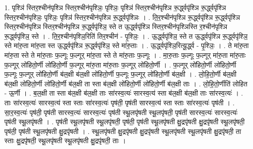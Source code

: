 \documentclass[17pt]{extarticle}
\begin{document}
1. पृश्ञि॑ स्तिर॒श्चीन॑पृश्ञि स्तिर॒श्चीन॑पृश्ञिः॒ पृश्ञिः॒ पृश्ञि॑ स्तिर॒श्चीन॑पृश्ञि रू॒र्द्ध्वपृ॑श्ञि रू॒र्द्ध्वपृ॑श्ञि स्तिर॒श्चीन॑पृश्ञिः॒ पृश्ञिः॒ पृश्ञि॑ स्तिर॒श्चीन॑पृश्ञि रू॒र्द्ध्वपृ॑श्ञिः । . ति॒र॒श्चीन॑पृश्ञि रू॒र्द्ध्वपृ॑श्ञि रू॒र्द्ध्वपृ॑श्ञि स्तिर॒श्चीन॑पृश्ञि स्तिर॒श्चीन॑पृश्ञि रू॒र्द्ध्वपृ॑श्ञि॒ स्ते त ऊ॒र्द्ध्वपृ॑श्ञि स्तिर॒श्चीन॑पृश्ञिस्ति र॒श्चीन॑पृश्ञि रू॒र्द्ध्वपृ॑श्ञि॒ स्ते । . ति॒र॒श्चीन॑पृश्ञि॒रिति॑ तिर॒श्चीन॑ - पृ॒श्ञिः॒ । . ऊ॒र्द्ध्वपृ॑श्ञि॒ स्ते त ऊ॒र्द्ध्वपृ॑श्ञि रू॒र्द्ध्वपृ॑श्ञि॒ स्ते मा॑रु॒ता मा॑रु॒ता स्त ऊ॒र्द्ध्वपृ॑श्ञि रू॒र्द्ध्वपृ॑श्ञि॒ स्ते मा॑रु॒ताः । . ऊ॒र्द्ध्वपृ॑श्ञि॒रित्यू॒र्द्ध्व - पृ॒श्ञिः॒ । . ते मा॑रु॒ता मा॑रु॒ता स्ते ते मा॑रु॒ताः फ॒ल्गूः फ॒ल्गूर् मा॑रु॒ता स्ते ते मा॑रु॒ताः फ॒ल्गूः । . मा॒रु॒ताः फ॒ल्गूः फ॒ल्गूर् मा॑रु॒ता मा॑रु॒ताः फ॒ल्गूर् लो॑हितो॒र्णी लो॑हितो॒र्णी फ॒ल्गूर् मा॑रु॒ता मा॑रु॒ताः फ॒ल्गूर् लो॑हितो॒र्णी । . फ॒ल्गूर् लो॑हितो॒र्णी लो॑हितो॒र्णी फ॒ल्गूः फ॒ल्गूर् लो॑हितो॒र्णी ब॑ल॒क्षी ब॑ल॒क्षी लो॑हितो॒र्णी फ॒ल्गूः फ॒ल्गूर् लो॑हितो॒र्णी ब॑ल॒क्षी । . लो॒हि॒तो॒र्णी ब॑ल॒क्षी ब॑ल॒क्षी लो॑हितो॒र्णी लो॑हितो॒र्णी ब॑ल॒क्षी ता स्ता ब॑ल॒क्षी लो॑हितो॒र्णी लो॑हितो॒र्णी ब॑ल॒क्षी ताः । . लो॒हि॒तो॒र्णीति॑ लोहित - ऊ॒र्णी । . ब॒ल॒क्षी ता स्ता ब॑ल॒क्षी ब॑ल॒क्षी ताः सा॑रस्व॒त्यः॑ सारस्व॒त्य॑ स्ता ब॑ल॒क्षी ब॑ल॒क्षी ताः सा॑रस्व॒त्यः॑ । . ताः सा॑रस्व॒त्यः॑ सारस्व॒त्य॑ स्ता स्ताः सा॑रस्व॒त्यः॑ पृष॑ती॒ पृष॑ती सारस्व॒त्य॑ स्ता स्ताः सा॑रस्व॒त्यः॑ पृष॑ती । . सा॒र॒स्व॒त्यः॑ पृष॑ती॒ पृष॑ती सारस्व॒त्यः॑ सारस्व॒त्यः॑ पृष॑ती स्थू॒लपृ॑षती स्थू॒लपृ॑षती॒ पृष॑ती सारस्व॒त्यः॑ सारस्व॒त्यः॑ पृष॑ती स्थू॒लपृ॑षती । . पृष॑ती स्थू॒लपृ॑षती स्थू॒लपृ॑षती॒ पृष॑ती॒ पृष॑ती स्थू॒लपृ॑षती क्षु॒द्रपृ॑षती क्षु॒द्रपृ॑षती स्थू॒लपृ॑षती॒ पृष॑ती॒ पृष॑ती स्थू॒लपृ॑षती क्षु॒द्रपृ॑षती । . स्थू॒लपृ॑षती क्षु॒द्रपृ॑षती क्षु॒द्रपृ॑षती स्थू॒लपृ॑षती स्थू॒लपृ॑षती क्षु॒द्रपृ॑षती॒ ता स्ताः क्षु॒द्रपृ॑षती॒ स्थू॒लपृ॑षती स्थू॒लपृ॑षती क्षु॒द्रपृ॑षती॒ ताः । \newline
\end{document}
